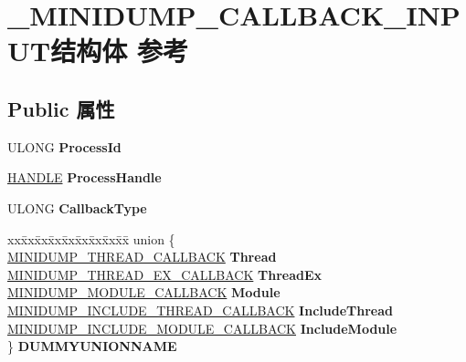 \hypertarget{struct___m_i_n_i_d_u_m_p___c_a_l_l_b_a_c_k___i_n_p_u_t}{}\section{\+\_\+\+M\+I\+N\+I\+D\+U\+M\+P\+\_\+\+C\+A\+L\+L\+B\+A\+C\+K\+\_\+\+I\+N\+P\+U\+T结构体 参考}
\label{struct___m_i_n_i_d_u_m_p___c_a_l_l_b_a_c_k___i_n_p_u_t}
\subsection*{Public 属性}
\begin{DoxyCompactItemize}
\item 
\mbox{\label{struct___m_i_n_i_d_u_m_p___c_a_l_l_b_a_c_k___i_n_p_u_t_a72868ae9b69a743b33b62e786ec0ef78}} 
U\+L\+O\+NG {\bfseries Process\+Id}
\item 
\mbox{\label{struct___m_i_n_i_d_u_m_p___c_a_l_l_b_a_c_k___i_n_p_u_t_a3bb9eec68c702558c329dd88a8ec1216}} 
\hyperlink{interfacevoid}{H\+A\+N\+D\+LE} {\bfseries Process\+Handle}
\item 
\mbox{\label{struct___m_i_n_i_d_u_m_p___c_a_l_l_b_a_c_k___i_n_p_u_t_a3f31b1c63034e4fe4199648ade717dac}} 
U\+L\+O\+NG {\bfseries Callback\+Type}
\item 
\mbox{\label{struct___m_i_n_i_d_u_m_p___c_a_l_l_b_a_c_k___i_n_p_u_t_afa98fc9f8a5bf5c2d400651cf48b1c1a}} 
\begin{tabbing}
xx\=xx\=xx\=xx\=xx\=xx\=xx\=xx\=xx\=\kill
union \{\\
\>\hyperlink{struct___m_i_n_i_d_u_m_p___t_h_r_e_a_d___c_a_l_l_b_a_c_k}{MINIDUMP\_THREAD\_CALLBACK} {\bfseries Thread}\\
\>\hyperlink{struct___m_i_n_i_d_u_m_p___t_h_r_e_a_d___e_x___c_a_l_l_b_a_c_k}{MINIDUMP\_THREAD\_EX\_CALLBACK} {\bfseries ThreadEx}\\
\>\hyperlink{struct___m_i_n_i_d_u_m_p___m_o_d_u_l_e___c_a_l_l_b_a_c_k}{MINIDUMP\_MODULE\_CALLBACK} {\bfseries Module}\\
\>\hyperlink{struct___m_i_n_i_d_u_m_p___i_n_c_l_u_d_e___t_h_r_e_a_d___c_a_l_l_b_a_c_k}{MINIDUMP\_INCLUDE\_THREAD\_CALLBACK} {\bfseries IncludeThread}\\
\>\hyperlink{struct___m_i_n_i_d_u_m_p___i_n_c_l_u_d_e___m_o_d_u_l_e___c_a_l_l_b_a_c_k}{MINIDUMP\_INCLUDE\_MODULE\_CALLBACK} {\bfseries IncludeModule}\\
\} {\bfseries DUMMYUNIONNAME}\\


\end{tabbing}
\end{DoxyCompactItemize}
